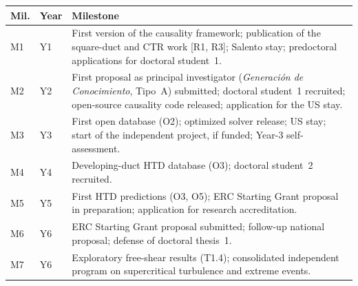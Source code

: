 \documentclass[11pt]{article}
\begin{document}
\begin{center}\small
\begin{tabularx}{\textwidth}{@{}p{0.8cm}p{1.35cm}X@{}}
\toprule
\textbf{Mil.} & \textbf{Year} & \textbf{Milestone} \\
\midrule
M1 & Y1 & First version of the causality framework; publication of the square-duct and CTR work [R1, R3]; Salento stay; predoctoral applications for doctoral student~1. \\
M2 & Y2 & First proposal as principal investigator (\emph{Generaci\'on de Conocimiento}, Tipo~A) submitted; doctoral student~1 recruited; open-source causality code released; application for the US stay. \\
M3 & Y3 & First open database (O2); optimized solver release; US stay; start of the independent project, if funded; Year-3 self-assessment. \\
M4 & Y4 & Developing-duct HTD database (O3); doctoral student~2 recruited. \\
M5 & Y5 & First HTD predictions (O3, O5); ERC Starting Grant proposal in preparation; application for research accreditation. \\
M6 & Y6 & ERC Starting Grant proposal submitted; follow-up national proposal; defense of doctoral thesis~1. \\
M7 & Y6 & Exploratory free-shear results (T1.4); consolidated independent program on supercritical turbulence and extreme events. \\
\bottomrule
\end{tabularx}
\end{center}
\end{document}
